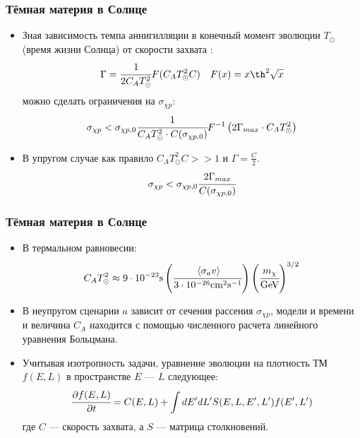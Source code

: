 \documentclass[
11pt,]{beamer}
\newcommand{\cderiv}[2]{\cfrac{\partial #1}{\partial #2}}
\newcommand{\avarage}[1]{\left\langle #1 \right\rangle}
\begin{document}
	\begin{frame}
		\frametitle{Тёмная материя в Солнце}
		\begin{itemize}
	\item Зная зависимость темпа аннигилляции в конечный момент эволюции $T_{\odot}$ (время жизни Солнца) от скорости захвата :
	 \begin{equation*}
	 	\Gamma =  \cfrac{1}{2 C_A T_{\odot}^2} F(C_A T_{\odot}^2 C) \quad F(x) = x\th^2{\sqrt{x}}
	 \end{equation*}
	 можно сделать ограничения на $\sigma_{\chi p}$:
	 \begin{equation*}
	 	\sigma_{\chi p} < \sigma_{\chi p, 0} \cfrac{1}{C_A T_{\odot}^2 \cdot C(\sigma_{\chi p,0})} F^{-1}\left(	2\Gamma_{max} \cdot C_A T_{\odot}^2\right)
	 \end{equation*}
	\item  В упругом случае как правило $C_AT_{\odot}^2 C >> 1$ и $\Gamma = \frac{C}{2}$.
	\begin{equation*}
		\sigma_{\chi p} < \sigma_{\chi p, 0} \cfrac{2\Gamma_{max}}{C(\sigma_{\chi p,0})} 
	\end{equation*}
\end{itemize}
	\end{frame}
	
	\begin{frame}
		\frametitle{Тёмная материя в Солнце}
		\begin{itemize}
	\item В термальном равновесии:
	\begin{equation*}
		C_A T_{\odot}^2 \approx
		9\cdot10^{-23} \text{s}	\left(\cfrac{   \avarage{\sigma_{a}v}    }{3\cdot10^{-26} \text{cm}^2\text{s}^{-1}} \right)
		\left(\cfrac{m_{\chi}}{\text{GeV}}\right)^{3/2}
	\end{equation*}
	\item В неупругом сценарии $a$ зависит от сечения рассения $\sigma_{\chi p}$, модели и времени и величина $C_A$ находится с помощью численного расчета линейного уравнения Больцмана.
	\item Учитывая изотропность задачи, уравнение эволюции на плотность ТМ $f(E,L)$ в пространстве $E$ --- $L$ следующее:
	\begin{equation*}
			\cderiv{f(E,L)}{t} = C(E,L)
			+ \int{dE'dL' S(E,L,E',L') f(E',L')}
	\end{equation*}
	где $C$ --- скорость захвата, а $S$ --- матрица столкновений.
\end{itemize}




	\end{frame}
\end{document}
